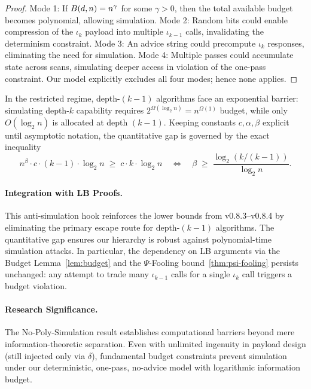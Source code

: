 \begin{proof}
Mode 1: If $\B(d,n) = n^\gamma$ for some $\gamma>0$, then the total available budget becomes polynomial, allowing simulation.
Mode 2: Random bits could enable compression of the $\iota_k$ payload into multiple $\iota_{k-1}$ calls, invalidating the determinism constraint.
Mode 3: An advice string could precompute $\iota_k$ responses, eliminating the need for simulation.
Mode 4: Multiple passes could accumulate state across scans, simulating deeper access in violation of the one-pass constraint.
Our model explicitly excludes all four modes; hence none applies.
\end{proof}

\begin{corollary}
\label{AntiSim:cor:barrier}
In the restricted regime, depth-\((k{-}1)\) algorithms face an exponential barrier: simulating depth-$k$ capability requires $2^{\Omega(\log_{2} n)} = n^{\Omega(1)}$ budget, while only $O(\log_{2} n)$ is allocated at depth $(k{-}1)$. Keeping constants $c,\alpha,\beta$ explicit until asymptotic notation, the quantitative gap is governed by the exact inequality
\[
n^{\beta} \cdot c \cdot (k{-}1) \cdot \log_{2} n
\;\ge\; c \cdot k \cdot \log_{2} n
\quad \Longleftrightarrow \quad
\beta \;\geq\; \frac{\log_{2}(k/(k{-}1))}{\log_{2} n}.
\]
\end{corollary}

\paragraph{Integration with LB Proofs.}
This anti-simulation hook reinforces the lower bounds from v0.8.3--v0.8.4 by eliminating the primary escape route for depth-\((k{-}1)\) algorithms. The quantitative gap ensures our hierarchy is robust against polynomial-time simulation attacks. In particular, the dependency on LB arguments via the Budget Lemma~\ref{lem:budget} and the $\Psi$-Fooling bound~\ref{thm:psi-fooling} persists unchanged: any attempt to trade many $\iota_{k-1}$ calls for a single $\iota_k$ call triggers a budget violation.

\paragraph{Research Significance.}
The No-Poly-Simulation result establishes computational barriers beyond mere information-theoretic separation. Even with unlimited ingenuity in payload design (still injected only via $\delta$), fundamental budget constraints prevent simulation under our deterministic, one-pass, no-advice model with logarithmic information budget.

